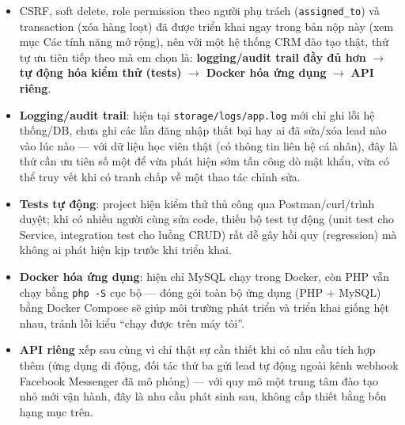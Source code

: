 \begin{enumerate}[label = \textbf{\arabic*.}, leftmargin=*]
    \begin{itemize}[leftmargin = 0.55cm, label = $\bullet$]
        \item CSRF, soft delete, role permission theo người phụ trách (\texttt{assigned\_to}) và transaction (xóa hàng loạt) đã được triển khai ngay trong bản nộp này (xem mục Các tính năng mở rộng), nên với một hệ thống CRM đào tạo thật, thứ tự ưu tiên tiếp theo mà em chọn là: \textbf{logging/audit trail đầy đủ hơn} $\rightarrow$ \textbf{tự động hóa kiểm thử (tests)} $\rightarrow$ \textbf{Docker hóa ứng dụng} $\rightarrow$ \textbf{API riêng}.
        \item \textbf{Logging/audit trail}: hiện tại \texttt{storage/logs/app.log} mới chỉ ghi lỗi hệ thống/DB, chưa ghi các lần đăng nhập thất bại hay ai đã sửa/xóa lead nào vào lúc nào — với dữ liệu học viên thật (có thông tin liên hệ cá nhân), đây là thứ cần ưu tiên số một để vừa phát hiện sớm tấn công dò mật khẩu, vừa có thể truy vết khi có tranh chấp về một thao tác chỉnh sửa.
        \item \textbf{Tests tự động}: project hiện kiểm thử thủ công qua Postman/curl/trình duyệt; khi có nhiều người cùng sửa code, thiếu bộ test tự động (unit test cho Service, integration test cho luồng CRUD) rất dễ gây hồi quy (regression) mà không ai phát hiện kịp trước khi triển khai.
        \item \textbf{Docker hóa ứng dụng}: hiện chỉ MySQL chạy trong Docker, còn PHP vẫn chạy bằng \texttt{php -S} cục bộ — đóng gói toàn bộ ứng dụng (PHP + MySQL) bằng Docker Compose sẽ giúp môi trường phát triển và triển khai giống hệt nhau, tránh lỗi kiểu ``chạy được trên máy tôi''.
        \item \textbf{API riêng} xếp sau cùng vì chỉ thật sự cần thiết khi có nhu cầu tích hợp thêm (ứng dụng di động, đối tác thứ ba gửi lead tự động ngoài kênh webhook Facebook Messenger đã mô phỏng) — với quy mô một trung tâm đào tạo nhỏ mới vận hành, đây là nhu cầu phát sinh sau, không cấp thiết bằng bốn hạng mục trên.
    \end{itemize}

\end{enumerate}
